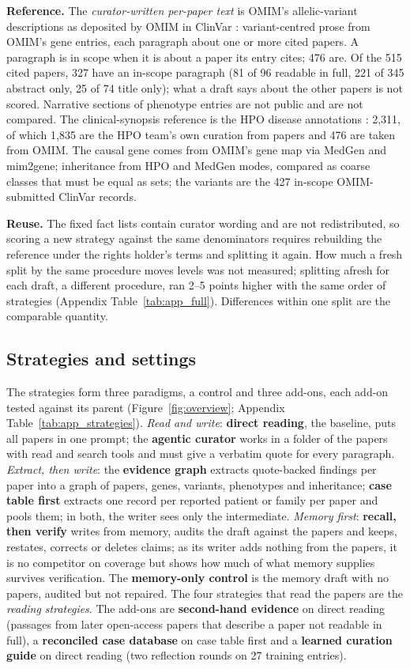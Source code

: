 \documentclass{article} %
\begin{document}
\textbf{Reference.} The \emph{curator-written per-paper text} is OMIM's allelic-variant descriptions as deposited by OMIM in ClinVar \citep{landrum2025clinvar}: variant-centred prose from OMIM's gene entries, each paragraph about one or more cited papers. A paragraph is in scope when it is about a paper its entry cites; 476 are. Of the 515 cited papers, 327 have an in-scope paragraph (81 of 96 readable in full, 221 of 345 abstract only, 25 of 74 title only); what a draft says about the other papers is not scored. Narrative sections of phenotype entries are not public and are not compared. The clinical-synopsis reference is the HPO disease annotations \citep{gargano2024human}: 2,311, of which 1,835 are the HPO team's own curation from papers and 476 are taken from OMIM. The causal gene comes from OMIM's gene map via MedGen \citep{Louden2020MedgenNcbis} and mim2gene; inheritance from HPO and MedGen modes, compared as coarse classes that must be equal as sets; the variants are the 427 in-scope OMIM-submitted ClinVar records.

\textbf{Reuse.} The fixed fact lists contain curator wording and are not redistributed, so scoring a new strategy against the same denominators requires rebuilding the reference under the rights holder's terms and splitting it again. How much a fresh split by the same procedure moves levels was not measured; splitting afresh for each draft, a different procedure, ran 2--5 points higher with the same order of strategies (Appendix Table~\ref{tab:app_full}). Differences within one split are the comparable quantity.

\subsection{Strategies and settings}
\label{sec:strategies}
The strategies form three paradigms, a control and three add-ons, each add-on tested against its parent (Figure~\ref{fig:overview}; Appendix Table~\ref{tab:app_strategies}). \emph{Read and write}: \textbf{direct reading}, the baseline, puts all papers in one prompt; the \textbf{agentic curator} works in a folder of the papers with read and search tools and must give a verbatim quote for every paragraph. \emph{Extract, then write}: the \textbf{evidence graph} extracts quote-backed findings per paper into a graph of papers, genes, variants, phenotypes and inheritance; \textbf{case table first} extracts one record per reported patient or family per paper and pools them; in both, the writer sees only the intermediate. \emph{Memory first}: \textbf{recall, then verify} writes from memory, audits the draft against the papers and keeps, restates, corrects or deletes claims; as its writer adds nothing from the papers, it is no competitor on coverage but shows how much of what memory supplies survives verification. The \textbf{memory-only control} is the memory draft with no papers, audited but not repaired. The four strategies that read the papers are the \emph{reading strategies}. The add-ons are \textbf{second-hand evidence} on direct reading (passages from later open-access papers that describe a paper not readable in full), a \textbf{reconciled case database} on case table first and a \textbf{learned curation guide} on direct reading (two reflection rounds on 27 training entries).
\end{document}
